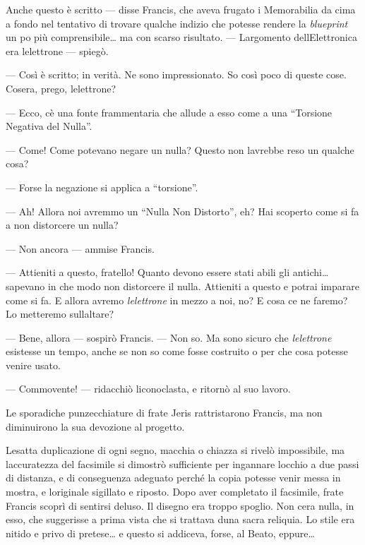 Anche questo è scritto --- disse Francis, che aveva frugato i
Memorabilia da cima a fondo nel tentativo di trovare qualche indizio che
potesse rendere la \emph{blueprint} un po\textquotesingle{} più
comprensibile\ldots{} ma con scarso risultato. ---
L\textquotesingle argomento dell\textquotesingle Elettronica era
l\textquotesingle elettrone --- spiegò.

--- Così è scritto; in verità. Ne sono impressionato. So così poco di
queste cose. Cos\textquotesingle era, prego,
l\textquotesingle elettrone?

--- Ecco, c\textquotesingle è una fonte frammentaria che allude a esso
come a una ``Torsione Negativa del Nulla''.

--- Come! Come potevano negare un nulla? Questo non
l\textquotesingle avrebbe reso un qualche cosa?

--- Forse la negazione si applica a ``torsione''.

--- Ah! Allora noi avremmo un ``Nulla Non Distorto'', eh? Hai scoperto
come si fa a non distorcere un nulla?

--- Non ancora --- ammise Francis.

--- Attieniti a questo, fratello! Quanto devono essere stati abili gli
antichi\ldots{} sapevano in che modo non distorcere il nulla. Attieniti
a questo e potrai imparare come si fa. E allora avremo
\emph{l\textquotesingle elettrone} in mezzo a noi, no? E cosa ce ne
faremo? Lo metteremo sull\textquotesingle altare?

--- Bene, allora --- sospirò Francis. --- Non so. Ma sono sicuro che
\emph{l\textquotesingle elettrone} esistesse un tempo, anche se non so
come fosse costruito o per che cosa potesse venire usato.

--- Commovente! --- ridacchiò l\textquotesingle iconoclasta, e ritornò
al suo lavoro.

Le sporadiche punzecchiature di frate Jeris rattristarono Francis, ma
non diminuirono la sua devozione al progetto.

L\textquotesingle esatta duplicazione di ogni segno, macchia o chiazza
si rivelò impossibile, ma l\textquotesingle accuratezza del facsimile si
dimostrò sufficiente per ingannare l\textquotesingle occhio a due passi
di distanza, e di conseguenza adeguato perché la copia potesse venir
messa in mostra, e l\textquotesingle originale sigillato e riposto. Dopo
aver completato il facsimile, frate Francis scoprì di sentirsi deluso.
Il disegno era troppo spoglio. Non c\textquotesingle era nulla, in esso,
che suggerisse a prima vista che si trattava d\textquotesingle una sacra
reliquia. Lo stile era nitido e privo di pretese\ldots{} e questo si
addiceva, forse, al Beato, eppure\ldots{}

